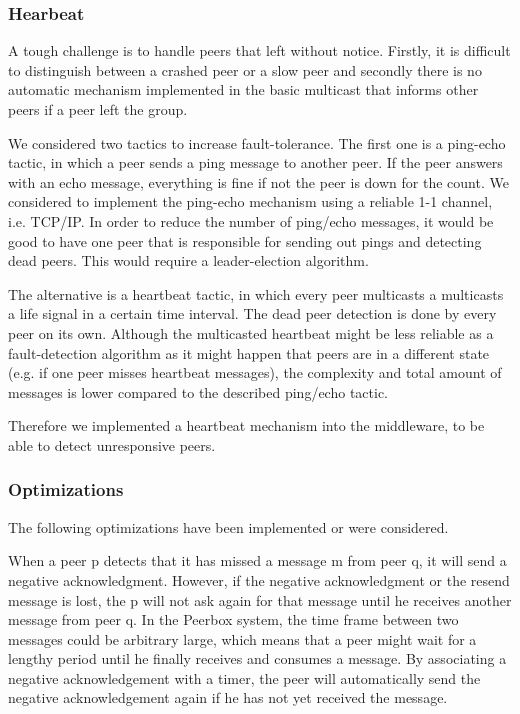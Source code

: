 \subsubsection{Hearbeat}
A tough challenge is to handle peers that left without notice. Firstly, it is difficult to distinguish between a crashed peer or a slow peer and  secondly there is no automatic mechanism implemented in the basic multicast that informs other peers if a peer left the group.

We considered two tactics to increase fault-tolerance. The first one is a ping-echo tactic, in which a peer sends a ping message to another peer. If the peer answers with an echo message, everything is fine if not the peer is down for the count. We considered to implement the ping-echo mechanism using a reliable 1-1 channel, i.e. TCP/IP. In order to reduce the number of ping/echo messages, it would be good to have one peer that is responsible for sending out pings and detecting dead peers. This would require a leader-election algorithm.

The alternative is a heartbeat tactic, in which every peer multicasts a multicasts a life signal in a certain time interval. The dead peer detection is done by every peer on its own. Although the multicasted heartbeat might be less reliable as a fault-detection algorithm as it might happen that peers are in a different state (e.g. if one peer misses heartbeat messages), the complexity and total amount of messages is lower compared to the described ping/echo tactic.

Therefore we implemented a heartbeat mechanism into the middleware, to be able to detect unresponsive peers.

\subsubsection{Optimizations}
The following optimizations have been implemented or were considered. 

When a peer p detects that it has missed a message m from peer q, it will send a negative acknowledgment. However, if the negative acknowledgment or the resend message is lost, the p will not ask again for that message until he receives another message from peer q. 
In the Peerbox system, the time frame between two messages could be arbitrary large, which means that a peer might wait for a lengthy period until he finally receives and consumes a message. 
By associating a negative acknowledgement with a timer, the peer will automatically send the negative acknowledgement again if he has not yet received the message.

